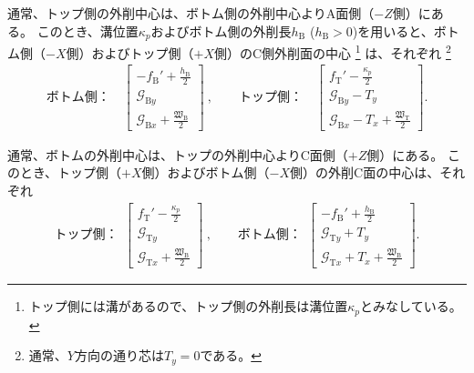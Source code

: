通常、トップ側の外削中心は、ボトム側の外削中心よりA面側（$-Z$側）にある。
このとき、溝位置$\kappa_p$およびボトム側の外削長$h_\mathrm B$ ($h_\mathrm B > 0$)を用いると、ボトム側（$-X$側）およびトップ側（$+X$側）のC側外削面の中心
\footnote{トップ側には溝があるので、トップ側の外削長は溝位置$\kappa_p$とみなしている。}
は、それぞれ
\footnote{通常、$Y$方向の通り芯は$T_y = 0$である。}
\begin{align}
  \label{eq:centerlineB}
  \text{ボトム側：}\quad
  \left[
    \begin{array}{c}
      \displaystyle -f_\mathrm B'+\frac{h_\mathrm B}2\\[5pt]
      \mathcal G_{\mathrm By}\\[3pt]
      \displaystyle \mathcal G_{\mathrm Bx}+\frac{\mathfrak W_\mathrm B}2
    \end{array}
    \right]~, \qquad
  \text{トップ側：}\quad
  \left[
    \begin{array}{c}
      \displaystyle f_\mathrm T'-\frac{\kappa_p}2\\[5pt]
      \mathcal G_{\mathrm By}-T_y\\[3pt]
      \displaystyle \mathcal G_{\mathrm Bx}-T_x+\frac{\mathfrak W_\mathrm T}2
    \end{array}
  \right].
\end{align}



通常、ボトムの外削中心は、トップの外削中心よりC面側（$+Z$側）にある。
このとき、トップ側（$+X$側）およびボトム側（$-X$側）の外削C面の中心は、それぞれ
\begin{align}
  \label{eq:centerlineT}
  \text{トップ側：}~~
  \left[
    \begin{array}{c}
      \displaystyle f_\mathrm T'-\frac{\kappa_p}2\\[5pt]
      \mathcal G_{\mathrm Ty}\\[3pt]
      \displaystyle \mathcal G_{\mathrm Tx}+\frac{\mathfrak W_\mathrm B}2
    \end{array}
    \right]~, \qquad
  \text{ボトム側：}~~
  \left[
    \begin{array}{c}
      \displaystyle -f_\mathrm B'+\frac{h_\mathrm B}2\\[5pt]
      \mathcal G_{\mathrm Ty}+T_y\\[3pt]
      \displaystyle \mathcal G_{\mathrm Tx}+T_x+\frac{\mathfrak W_\mathrm B}2
    \end{array}
  \right].
\end{align}

